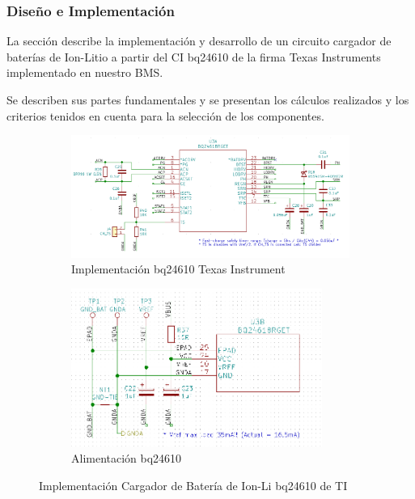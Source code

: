 \documentclass[10pt,a4paper]{article}
\begin{document}
\begin{itemize}
\subsubsection{Diseño e Implementación}

La sección describe la implementación y desarrollo de un circuito cargador de
baterías de Ion-Litio a partir del \acrfull{CI} bq24610 de la firma Texas
Instruments implementado en nuestro \acrshort{BMS}.

Se describen sus partes fundamentales y se presentan los cálculos realizados y
los criterios tenidos en cuenta para la selección de los componentes. 

\begin{figure}[h!]
    \centering
    \begin{subfigure}[t]{0.6\textwidth}
        \centering
        \includegraphics[width=1.1\textwidth]{hardware/bat_charger/bc_ic.png}
        \caption{Implementación bq24610 Texas Instrument}
        \label{fig:bc_ic_ti}
    \end{subfigure}
    \hfill
    \begin{subfigure}[t]{0.35\textwidth}
        \centering
        \includegraphics[width=0.9\textwidth]{hardware/bat_charger/bc_ic_power_supply.png}
        \caption{Alimentación bq24610}
        \label{fig:bc_ic_power_supply}
    \end{subfigure}
    \caption{Implementación Cargador de Batería de Ion-Li bq24610 de TI}
    \label{fig:bc_ic}
\end{figure}
\FloatBarrier


\end{itemize}
\end{document}
